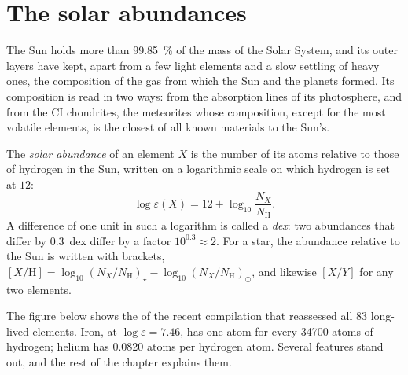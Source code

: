 \section{The solar abundances}\label{sec:b3:origin-of-elements:solar}

The Sun holds more than \qty{99.85}{\percent} of the mass of the Solar
System, and its outer layers have kept, apart from a few light elements
and a slow settling of heavy ones, the composition of the gas from which
the Sun and the planets formed. Its composition is read in two ways:
from the absorption lines of its photosphere, and from the CI chondrites,
the meteorites whose composition, except for the most volatile
elements, is the closest of all known materials to the Sun's.

\begin{definition}\label{def:b3:origin-of-elements:abundance}
The \emph{solar abundance} of an element $X$ is
the number of its atoms relative to those of hydrogen in the Sun,
written on a logarithmic scale on which hydrogen is set at $12$:
\[
\log\varepsilon(X) = 12 + \log_{10}\frac{N_X}{N_\mathrm{H}} .
\]
A difference of one unit in such a logarithm is called a
\emph{dex}: two abundances that differ by $0.3$~dex differ by
a factor $10^{0.3} \approx 2$. For a star, the abundance relative to the
Sun is written with brackets,
$[X/\mathrm{H}] = \log_{10}(N_X/N_\mathrm{H})_\star -
\log_{10}(N_X/N_\mathrm{H})_\odot$, and likewise $[X/Y]$ for any two
elements.
\end{definition}

The figure below shows the  of the recent compilation
that reassessed all 83 long-lived elements. Iron, at
$\log\varepsilon = 7.46$, has one atom for every \num{34700} atoms of
hydrogen; helium has \num{0.0820} atoms per hydrogen atom. Several
features stand out, and the rest of the chapter explains them.

